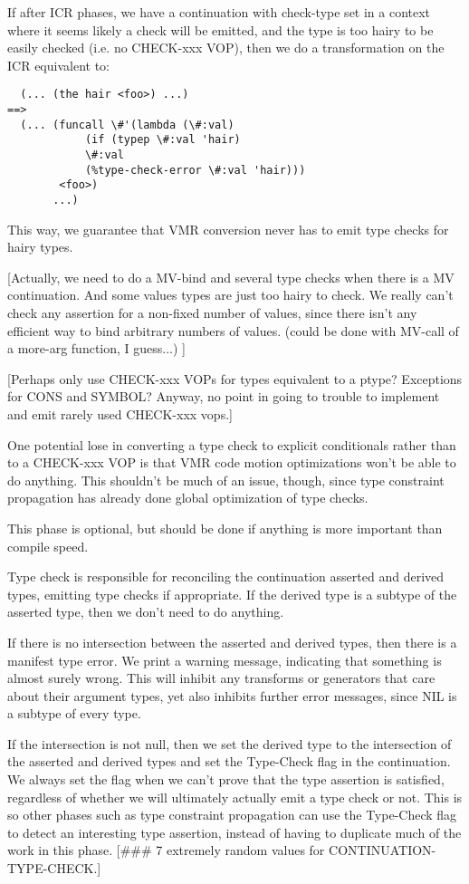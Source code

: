 If after ICR phases, we have a continuation with check-type set in a context
where it seems likely a check will be emitted, and the type is too 
hairy to be easily checked (i.e. no CHECK-xxx VOP), then we do a transformation
on the ICR equivalent to:
\begin{verbatim}
  (... (the hair <foo>) ...)
==>
  (... (funcall \#'(lambda (\#:val)
		    (if (typep \#:val 'hair)
			\#:val
			(%type-check-error \#:val 'hair)))
		<foo>)
       ...)
\end{verbatim}
This way, we guarantee that VMR conversion never has to emit type checks for
hairy types.

[Actually, we need to do a MV-bind and several type checks when there is a MV
continuation.  And some values types are just too hairy to check.  We really
can't check any assertion for a non-fixed number of values, since there isn't
any efficient way to bind arbitrary numbers of values.  (could be done with
MV-call of a more-arg function, I guess...)
]

[Perhaps only use CHECK-xxx VOPs for types equivalent to a ptype?  Exceptions
for CONS and SYMBOL?  Anyway, no point in going to trouble to implement and
emit rarely used CHECK-xxx vops.]

One potential lose in converting a type check to explicit conditionals rather
than to a CHECK-xxx VOP is that VMR code motion optimizations won't be able to
do anything.  This shouldn't be much of an issue, though, since type constraint
propagation has already done global optimization of type checks.


This phase is optional, but should be done if anything is more important than
compile speed.  

Type check is responsible for reconciling the continuation asserted and derived
types, emitting type checks if appropriate.  If the derived type is a subtype
of the asserted type, then we don't need to do anything.

If there is no intersection between the asserted and derived types, then there
is a manifest type error.  We print a warning message, indicating that
something is almost surely wrong.  This will inhibit any transforms or
generators that care about their argument types, yet also inhibits further
error messages, since NIL is a subtype of every type.

If the intersection is not null, then we set the derived type to the
intersection of the asserted and derived types and set the Type-Check flag in
the continuation.  We always set the flag when we can't prove that the type
assertion is satisfied, regardless of whether we will ultimately actually emit
a type check or not.  This is so other phases such as type constraint
propagation can use the Type-Check flag to detect an interesting type
assertion, instead of having to duplicate much of the work in this phase.  
[\#\#\# 7 extremely random values for CONTINUATION-TYPE-CHECK.]


